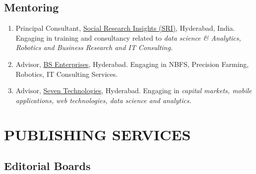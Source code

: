 \documentclass[10pt]{article}
\begin{document}
\subsection{Mentoring}

\begin{enumerate}
\item Principal Consultant, \href{www.sri-india.in}{Social Research Insights (SRI)}, Hyderabad, India. Engaging in training and consultancy related to \emph{data science \& Analytics, Robotics and Business Research and IT Consulting.}

\item Advisor, \href{www.bse-global.org}{BS Enterprises}, Hyderabad. Engaging in NBFS, Precision Farming, Robotics, IT Consulting Services. 

\item Advisor, \href{http://www.saven.in/}{Seven Technologies}, Hyderabad. Engaging in \emph{capital markets, mobile applications, web technologies, data science and analytics.}

\end{enumerate}
  
\section{PUBLISHING SERVICES} \hline \vspace{0.5cm}

\subsection{Editorial Boards}
\end{document}
